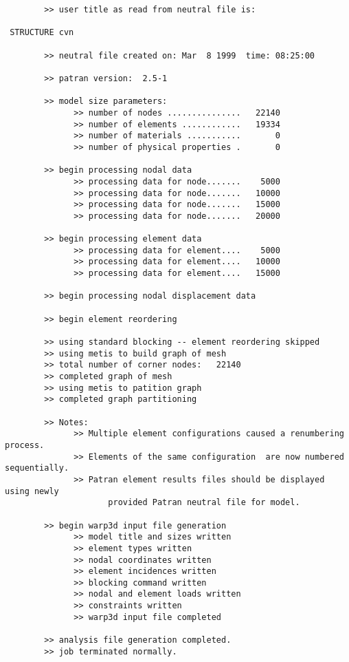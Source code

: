 \documentclass[11pt]{report}
\numberwithin{equation}{section}
\begin{document}
\begin{verbatim}
        >> user title as read from neutral file is:

 STRUCTURE cvn                                                                   

        >> neutral file created on: Mar  8 1999  time: 08:25:00

        >> patran version:  2.5-1

        >> model size parameters:
              >> number of nodes ...............   22140
              >> number of elements ............   19334
              >> number of materials ...........       0
              >> number of physical properties .       0

        >> begin processing nodal data
              >> processing data for node.......    5000
              >> processing data for node.......   10000
              >> processing data for node.......   15000
              >> processing data for node.......   20000

        >> begin processing element data
              >> processing data for element....    5000
              >> processing data for element....   10000
              >> processing data for element....   15000

        >> begin processing nodal displacement data

        >> begin element reordering

        >> using standard blocking -- element reordering skipped
        >> using metis to build graph of mesh
        >> total number of corner nodes:   22140
        >> completed graph of mesh
        >> using metis to patition graph
        >> completed graph partitioning

        >> Notes:
              >> Multiple element configurations caused a renumbering process.
              >> Elements of the same configuration  are now numbered sequentially.
              >> Patran element results files should be displayed using newly
                     provided Patran neutral file for model.

        >> begin warp3d input file generation
              >> model title and sizes written
              >> element types written
              >> nodal coordinates written
              >> element incidences written
              >> blocking command written
              >> nodal and element loads written
              >> constraints written
              >> warp3d input file completed

        >> analysis file generation completed.
        >> job terminated normally. 
\end{verbatim}
\normalsize
\end{document}
